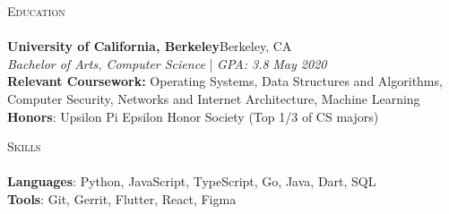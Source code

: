 \documentclass[a4paper]{article}
\newcommand{\lineunder} {
    \vspace*{-8pt} \\
    \hspace*{-2pt} \hrulefill \\
}
\newcommand{\header} [1] {
    {\hspace*{-2pt}\vspace*{6pt} \textsc{#1}}
    \vspace*{-4pt} \lineunder
}
\begin{document}
\header{{\large Education}}
\vspace{2mm}
\textbf{University of California, Berkeley}\hfill Berkeley, CA\\
\vspace{2mm}
\textit{Bachelor of Arts, Computer Science} | \textit{GPA: 3.8} \hfill \textit{May 2020}\\
\vspace{4mm}
\textbf{Relevant Coursework:} Operating Systems, Data Structures and Algorithms, Computer Security, Networks and Internet Architecture, Machine Learning\\
\vspace{2mm}
\textbf{Honors}: Upsilon Pi Epsilon Honor Society (Top 1/3 of CS majors)\\
\vspace{6mm}


\header{{\large Skills}}
\vspace{2mm}
\textbf{Languages}:  Python, JavaScript, TypeScript, Go, Java, Dart, SQL\\
\vspace{2mm}
\textbf{Tools}: Git, Gerrit, Flutter, React, Figma \\
\end{document}
